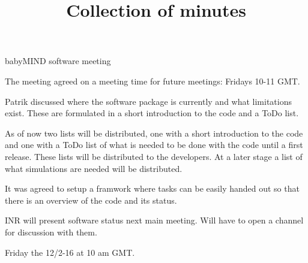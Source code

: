 \documentclass{article}
\title{Collection of minutes}
\author{\LaTeXe}
\begin{document}
\begin{Minutes}{babyMIND software meeting}
\maketitle

The meeting agreed on a meeting time for future meetings: Fridays 10-11 GMT.

Patrik discussed where the software package is currently and what limitations exist. These are formulated in a short introduction to the code and a ToDo list.

As of now two lists will be distributed, one with a short introduction to the code and one with a ToDo list of what is needed to be done with the code until a first release. These lists will be distributed to the developers. At a later stage a list of what simulations are needed will be distributed. 

It was agreed to setup a framwork where tasks can be easily handed out so that there is an overview of the code and its status.



INR will present software status next main meeting. Will have to open a channel for discussion with them.

Friday the 12/2-16 at 10 am GMT.

\end{Minutes}
\end{document}
